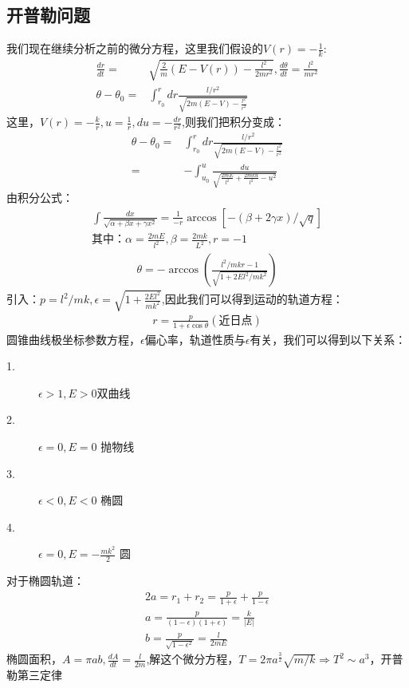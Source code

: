 \documentclass[UTF8,10pt]{article}
\begin{document}
\subsection{开普勒问题}
我们现在继续分析之前的微分方程，这里我们假设的$V(r)=-\frac{1}{k}$:
\begin{align*}
    \frac{dr}{dt}=   & \sqrt{\frac{2}{m}(E-V(r))-\frac{l^2}{2mr^2}},
    \frac{d\theta}{dt}=\frac{l^2}{mr^2}                                             \\
    \theta-\theta_0= & \int_{r_0}^r dr \frac{l/r^2}{\sqrt{2m(E-V)-\frac{l^2}{r^2}}}
\end{align*}
这里，$V(r)=-\frac{k}{r},u=\frac{1}{r},du=-\frac{dr}{r^2}$,则我们把积分变成：
\begin{align*}
    \theta-\theta_0= & \int_{r_0}^r dr \frac{l/r^2}{\sqrt{2m(E-V)-\frac{l^2}{r^2}}}        \\
    =                & -\int_{u_0}^u\frac{du}{\sqrt{\frac{2mE}{l^2}+\frac{2mku}{l^2}-u^2}}
\end{align*}
由积分公式：
\begin{align*}
    \int\frac{dx}{\sqrt{\alpha+\beta x+\gamma x^2}}=\frac{1}{-r}\arccos[-(\beta+2\gamma x)/\sqrt{q}] \\
    \text{其中：}\alpha=\frac{2mE}{l^2}, \beta=\frac{2mk}{L^2},r=-1
\end{align*}
\begin{align*}
    \theta = -\arccos(\frac{l^2/mkr-1}{\sqrt{1+2El^2/mk^2}})
\end{align*}
引入：$p=l^2/mk,\epsilon=\sqrt{1+\frac{2El^2}{mk^2}}$,因此我们可以得到运动的轨道方程：
\begin{align*}
    r=\frac{p}{1+\epsilon \cos \theta}(\text{近日点})
\end{align*}
圆锥曲线极坐标参数方程，$\epsilon$偏心率，轨道性质与$\epsilon$有关，我们可以得到以下关系：
\begin{description}
    \item[1.] $\epsilon > 1,E>0$双曲线
    \item[2.] $\epsilon=0,E=0$ 抛物线
    \item[3.] $\epsilon<0,E<0$ 椭圆
    \item[4.] $\epsilon=0,E=-\frac{mk^2}{2}$ 圆
\end{description}
对于椭圆轨道：
\begin{align*}
    2a=r_1+r_2=\frac{p}{1+\epsilon}+\frac{p}{1-\epsilon} \\
    a=\frac{p}{(1-\epsilon)(1+\epsilon)}=\frac{k}{|E|}   \\
    b=\frac{p}{\sqrt{1-\epsilon^2}}=\frac{l}{2mE}
\end{align*}
椭圆面积，$A=\pi ab,\frac{dA}{dt}=\frac{l}{2m}$,解这个微分方程，$T=2\pi a^{\frac{3}{2}}\sqrt{m/k}\Rightarrow T^2\sim a^3$，开普勒第三定律
\end{document}
